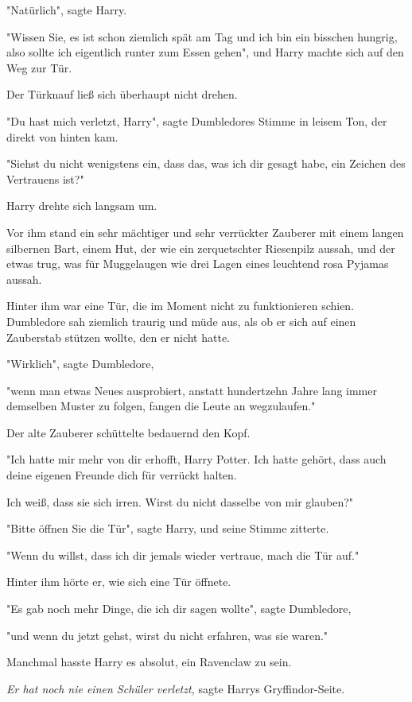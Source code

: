 {"Natürlich", sagte Harry.

"Wissen Sie, es ist schon ziemlich spät am Tag und ich bin ein bisschen hungrig, also sollte ich eigentlich runter zum Essen gehen", und Harry machte sich auf den Weg zur Tür.

Der Türknauf ließ sich überhaupt nicht drehen.

"Du hast mich verletzt, Harry", sagte Dumbledores Stimme in leisem Ton, der direkt von hinten kam.

"Siehst du nicht wenigstens ein, dass das, was ich dir gesagt habe, ein Zeichen des Vertrauens ist?"

Harry drehte sich langsam um.

Vor ihm stand ein sehr mächtiger und sehr verrückter Zauberer mit einem langen silbernen Bart, einem Hut, der wie ein zerquetschter Riesenpilz aussah, und der etwas trug, was für Muggelaugen wie drei Lagen eines leuchtend rosa Pyjamas aussah.

Hinter ihm war eine Tür, die im Moment nicht zu funktionieren schien. Dumbledore sah ziemlich traurig und müde aus, als ob er sich auf einen Zauberstab stützen wollte, den er nicht hatte.

"Wirklich", sagte Dumbledore,

"wenn man etwas Neues ausprobiert, anstatt hundertzehn Jahre lang immer demselben Muster zu folgen, fangen die Leute an wegzulaufen."

Der alte Zauberer schüttelte bedauernd den Kopf.

"Ich hatte mir mehr von dir erhofft, Harry Potter. Ich hatte gehört, dass auch deine eigenen Freunde dich für verrückt halten.

Ich weiß, dass sie sich irren. Wirst du nicht dasselbe von mir glauben?"

"Bitte öffnen Sie die Tür", sagte Harry, und seine Stimme zitterte.

"Wenn du willst, dass ich dir jemals wieder vertraue, mach die Tür auf."

Hinter ihm hörte er, wie sich eine Tür öffnete.

"Es gab noch mehr Dinge, die ich dir sagen wollte", sagte Dumbledore,

"und wenn du jetzt gehst, wirst du nicht erfahren, was sie waren."

Manchmal hasste Harry es absolut, ein Ravenclaw zu sein.

\emph{Er hat noch nie einen Schüler verletzt,} sagte Harrys Gryffindor-Seite.

}

